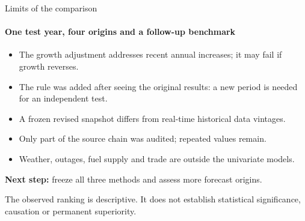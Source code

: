 \documentclass[aspectratio=169,10pt]{beamer}
\newcommand{\Source}[1]{\par\vfill{\fontsize{6.5}{7.5}\selectfont\color{black!65}#1\par}}
\begin{document}
\begin{frame}[t]{Limits of the comparison}
\framesubtitle{One test year, four origins and a follow-up benchmark}
\begin{itemize}
\item The growth adjustment addresses recent annual increases; it may fail if growth reverses.
\item The rule was added after seeing the original results: a new period is needed for an independent test.
\item A frozen revised snapshot differs from real-time historical data vintages.
\item Only part of the source chain was audited; repeated values remain.
\item Weather, outages, fuel supply and trade are outside the univariate models.
\end{itemize}
\par\medskip
\textbf{Next step:} freeze all three methods and assess more forecast origins.
\Source{The observed ranking is descriptive. It does not establish statistical significance, causation or permanent superiority.}
\end{frame}
\end{document}
